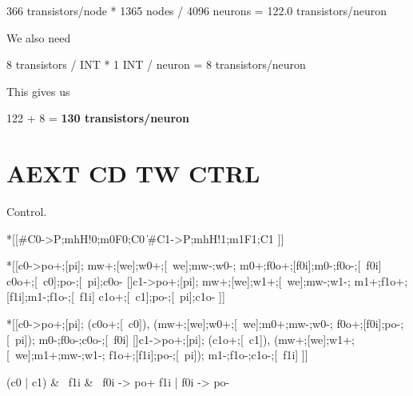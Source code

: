 \documentclass{article}
\begin{document}
366 transistors/node * 1365 nodes / 4096 neurons = 122.0 transistors/neuron

We also need

8 transistors / INT * 1 INT / neuron = 8 transistors/neuron

This gives us

122 + 8 = \textbf{130 transistors/neuron}

%
%
%
%
%

\section{AEXT CD TW CTRL \label{sec:AEXT_CD_TW_CTRL}}

Control.

\begin{csp}
*[[#{C0}->P;mh\*H!0;m0\*F0;C0
  \|#{C1}->P;mh\*H!1;m1\*F1;C1
 ]]
\end{csp}

\begin{hse} %
*[[c0->po+;[pi];
       mw+;[we];w0+;[~we];mw-;w0-;
       m0+;f0o+;[f0i];m0-;f0o-;[~f0i]
       c0o+;[~c0];po-;[~pi];c0o-
  []c1->po+;[pi];
       mw+;[we];w1+;[~we];mw-;w1-;
       m1+;f1o+;[f1i];m1-;f1o-;[~f1i]
       c1o+;[~c1];po-;[~pi];c1o-
 ]]
\end{hse}

\begin{hse} %
*[[c0->po+;[pi];
       (c0o+;[~c0]),
       (mw+;[we];w0+;[~we];m0+;mw-;w0-;
       f0o+;[f0i];po-;[~pi]);
       m0-;f0o-;c0o-;[~f0i]
  []c1->po+;[pi];
       (c1o+;[~c1]),
       (mw+;[we];w1+;[~we];m1+;mw-;w1-;
       f1o+;[f1i];po-;[~pi]);
       m1-;f1o-;c1o-;[~f1i]
 ]]
\end{hse}

\begin{prs2}
(c0 | c1) & ~f1i & ~f0i -> po+
f1i | f0i -> po-
\end{prs2}
\end{document}
